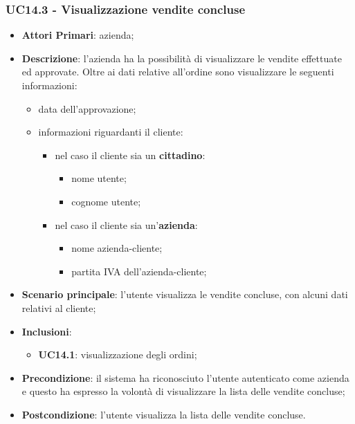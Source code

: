 \subsubsection{UC14.3 - Visualizzazione vendite concluse}
\begin{itemize}
	\item \textbf{Attori Primari}: azienda;
	\item \textbf{Descrizione}: l'azienda ha la possibilità di visualizzare le vendite effettuate ed approvate. Oltre ai dati relative all'ordine sono visualizzare le seguenti informazioni:
		\begin{itemize}
		\item data dell'approvazione;
		\item informazioni riguardanti il cliente:
		\begin{itemize}
			\item nel caso il cliente sia un \textbf{cittadino}:
			\begin{itemize}
				
				\item nome utente;
				\item cognome utente;
			\end{itemize}
			\item nel caso il cliente sia un'\textbf{azienda}:
			\begin{itemize}
				
				\item nome azienda-cliente;
				\item partita IVA dell'azienda-cliente;
			\end{itemize}
		\end{itemize}
		
	\end{itemize}
	\item \textbf{Scenario principale}:  l'utente visualizza le vendite concluse, con alcuni dati relativi al cliente; 
	\item \textbf{Inclusioni}:
	\begin{itemize}
		\item \textbf{UC14.1}: visualizzazione degli ordini;
	\end{itemize}
	\item \textbf{Precondizione}: il sistema ha riconosciuto l'utente autenticato come azienda e questo ha espresso la volontà di visualizzare la lista delle vendite concluse;
	\item \textbf{Postcondizione}: l'utente visualizza la lista delle vendite concluse.
\end{itemize}


